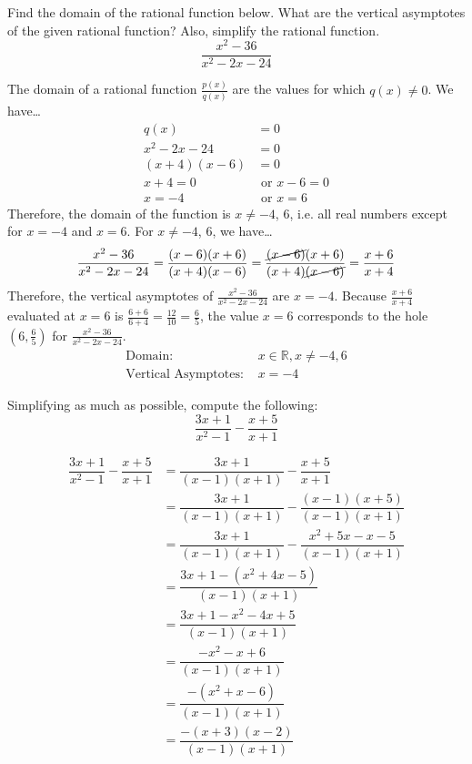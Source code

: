 \documentclass[11pt,letterpaper]{article}
\begin{document}

 Find the domain of the rational function below. What are the vertical asymptotes of the given rational function? Also, simplify the rational function. 
	\[
	\dfrac{x^2 - 36}{x^2 - 2x - 24}
	\] \pspace

\sol The domain of a rational function $\frac{p(x)}{q(x)}$ are the values for which $q(x) \neq 0$. We have\dots \pspace
	\[
	\begin{aligned}
	q(x)&= 0 \\[0.3cm]
	x^2 - 2x - 24&= 0 \\[0.3cm]
	(x + 4)(x - 6)&= 0 \\[0.3cm]
	x + 4= 0 &\text{  or  } x - 6= 0 \\[0.3cm]
	x= -4 &\text{  or  } x= 6
	\end{aligned}
	\] \pspace
Therefore, the domain of the function is $x \neq -4$, $6$, i.e. all real numbers except for $x= -4$ and $x= 6$. For $x \neq -4$, $6$, we have\dots \pspace
	\[
	\dfrac{x^2 - 36}{x^2 - 2x - 24}= \dfrac{(x - 6)(x + 6)}{(x + 4)(x - 6)}= \dfrac{\cancel{(x - 6)}(x + 6)}{(x + 4)\cancel{(x - 6)}}= \dfrac{x + 6}{x + 4}
	\] \pspace
Therefore, the vertical asymptotes of $\frac{x^2 - 36}{x^2 - 2x - 24}$ are $x= -4$. Because $\frac{x + 6}{x + 4}$ evaluated at $x= 6$ is $\frac{6 + 6}{6 + 4}= \frac{12}{10}= \frac{6}{5}$, the value $x= 6$ corresponds to the hole $(6, \frac{6}{5})$ for $\frac{x^2 - 36}{x^2 - 2x - 24}$. \pspace
	\[
	\boxed{
	\begin{aligned}
	\text{Domain: }& x \in \mathbb{R}, x \neq -4, 6 \\
	\text{Vertical Asymptotes: }& x= -4
	\end{aligned}
	}
	\]



\newpage



 Simplifying as much as possible, compute the following:
	\[
	\dfrac{3x + 1}{x^2 - 1} - \dfrac{x + 5}{x + 1}
	\] \pspace

\sol
	\[
	\begin{aligned}
	\dfrac{3x + 1}{x^2 - 1} - \dfrac{x + 5}{x + 1}&= \dfrac{3x + 1}{(x - 1)(x + 1)} - \dfrac{x + 5}{x + 1} \\[0.3cm]
	&= \dfrac{3x + 1}{(x - 1)(x + 1)} - \dfrac{(x - 1)(x + 5)}{(x - 1)(x + 1)} \\[0.3cm]
	&= \dfrac{3x + 1}{(x - 1)(x + 1)} - \dfrac{x^2 + 5x - x - 5}{(x - 1)(x + 1)} \\[0.3cm]
	&= \dfrac{3x + 1 - (x^2 + 4x - 5)}{(x - 1)(x + 1)} \\[0.3cm]
	&= \dfrac{3x + 1 - x^2 - 4x + 5}{(x - 1)(x + 1)} \\[0.3cm]
	&= \dfrac{-x^2 - x + 6}{(x - 1)(x + 1)} \\[0.3cm]
	&= \dfrac{-(x^2 + x - 6)}{(x - 1)(x + 1)} \\[0.3cm]
	&= \dfrac{-(x + 3)(x - 2)}{(x - 1)(x + 1)} \\[0.3cm]
	\end{aligned}
	\]
\end{document}
